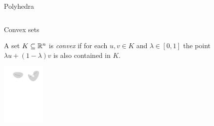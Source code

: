 \begin{frame}{Polyhedra}
\begin{columns}
\begin{column}{.5\textwidth}
\begin{tikzpicture}[scale=.45]
      
          
    \end{tikzpicture} 


    \end{column}       
  \end{columns}

\end{frame}







\begin{frame}{Convex sets}


\begin{definition}
  \label{conv:def:2}
  A set $K\subseteq\setR^n$ is \emph{convex} if for each $u,v \in K$
  and $\lambda \in [0,1]$ the point $\lambda u+(1-\lambda)v$ is also
  contained in $K$. \end{definition}

\bigskip 
\centering
  \includegraphics[height=3cm]{../figures/exconv.pdf} 



  
  \begin{columns}
    \begin{column}{.5\textwidth}
      
    \end{column}
    \begin{column}{.5\textwidth}
      
    \end{column}       
  \end{columns}
\end{frame}






